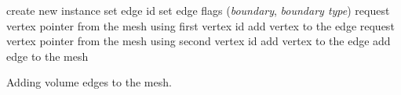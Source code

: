 \documentclass{article}
\begin{document}




\begin{algorithm}
\begin{algorithmic}[1]
\STATE create new instance
\STATE set edge id
\STATE set edge flags (\emph{boundary}, \emph{boundary type})
\STATE request vertex pointer from the mesh using first vertex id
\STATE add vertex to the edge
\STATE request vertex pointer from the mesh using second vertex id
\STATE add vertex to the edge
\STATE add edge to the mesh
\ENDFOR
\end{algorithmic}
\caption{Adding volume edges to the mesh.}
\label{algo:volume_edge_assembly}
\end{algorithm}





\end{document}
